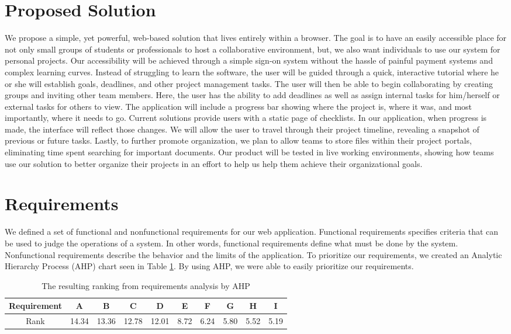 \section{Proposed Solution}

We propose a simple, yet powerful, web-based solution that lives entirely within a browser. The goal is to have an easily accessible place for not only small groups of students or professionals to host a collaborative environment, but, we also want individuals to use our system for personal projects. Our accessibility will be achieved through a simple sign-on system without the hassle of painful payment systems and complex learning curves. Instead of struggling to learn the software, the user will be guided through a quick, interactive tutorial where he or she will establish goals, deadlines, and other project management tasks. The user will then be able to begin collaborating by creating groups and inviting other team members. Here, the user has the ability to add deadlines as well as assign internal tasks for him/herself or external tasks for others to view. The application will include a progress bar showing where the project is, where it was, and most importantly, where it needs to go. Current solutions provide users with a static page of checklists. In our application, when progress is made, the interface will reflect those changes. We will allow the user to travel through their project timeline, revealing a snapshot of previous or future tasks. Lastly, to further promote organization, we plan to allow teams to store files within their project portals, eliminating time spent searching for important documents. Our product will be tested in live working environments, showing how teams use our solution to better organize their projects in an effort to help us help them achieve their organizational goals. 

\section{Requirements}
We defined a set of functional and nonfunctional requirements for our web application. Functional requirements specifies criteria that can be used to judge the operations of a system. In other words, functional requirements define what must be done by the system. Nonfunctional requirements describe the behavior and the limits of the application. To prioritize our requirements, we created an Analytic Hierarchy Process (AHP) chart seen in Table \ref{ahp}. By using AHP, we were able to easily prioritize our requirements.
\FloatBarrier
\begin{table}[ht]
\centering
\begin{tabular}{|c|c|c|c|c|c|c|c|c|c|}
	\hline
	Requirement & A & B & C & D & E & F & G & H & I  \\
	\hline
	Rank & 14.34 & 13.36 & 12.78 & 12.01 & 8.72 & 6.24 & 5.80 & 5.52 & 5.19 \\
	\hline
\end{tabular}
\caption{The resulting ranking from requirements analysis by AHP}
\label{ahp}
\end{table}
\FloatBarrier

